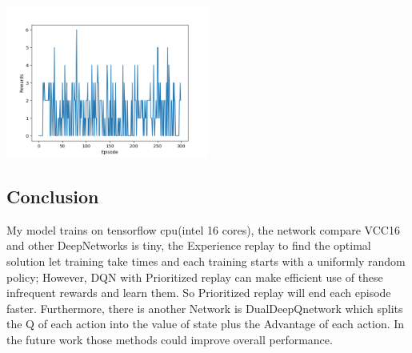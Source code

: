 \documentclass[a4paper, 11pt]{article}
\begin{document}
\includegraphics[height = 5cm]{higher.png}
\subsection*{Conclusion}
My model trains on tensorflow cpu(intel 16 cores), the network compare VCC16 and other DeepNetworks is tiny, the Experience replay to find the optimal solution let training take times and each training starts with a uniformly random policy; However, DQN with Prioritized replay can make efficient use of these infrequent rewards and learn them. So Prioritized replay will end each episode faster. Furthermore, there is another Network is DualDeepQnetwork which splits the Q of each action into the value of state plus the Advantage of each action. In the future work those methods could improve overall performance.
\end{document}
